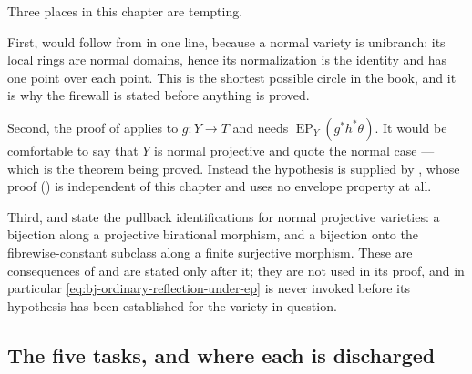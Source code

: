 \begin{remark}
\label{rem:ch42-firewall-not-vacuous}
Three places in this chapter are tempting.

First,  would follow from
 in one line, because a normal variety is
unibranch: its local rings are normal domains, hence its normalization is
the identity and has one point over each point.  This is the shortest
possible circle in the book, and it is why the firewall is stated before
anything is proved.

Second, the proof of  applies
 to $g:Y\to T$ and needs
$\operatorname{EP}_Y(g^*h^*\theta)$.  It would be comfortable to say that
$Y$ is normal projective and quote the normal case --- which is the
theorem being proved.  Instead the hypothesis is supplied by
, whose proof
() is independent of this chapter and
uses no envelope property at all.

Third,  and
 state the pullback identifications for normal projective varieties:
a bijection along a projective birational morphism, and a bijection onto
the fibrewise-constant subclass along a finite surjective morphism.  These are consequences of  and are
stated only after it; they are not used in its proof, and in particular
\eqref{eq:bj-ordinary-reflection-under-ep} is never invoked before its
hypothesis has been established for the variety in question.
\end{remark}

\subsection{The five tasks, and where each is discharged}
\label{sec:ch42-tasks}

